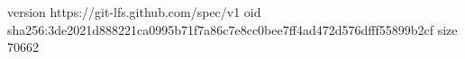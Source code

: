 version https://git-lfs.github.com/spec/v1
oid sha256:3de2021d888221ca0995b71f7a86c7e8cc0bee7ff4ad472d576dfff55899b2cf
size 70662
